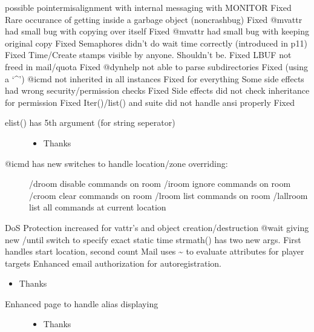 \documentclass[letterpaper,10pt,english]{sphinxmanual}
\begin{document}
\sphinxAtStartPar
possible pointer\sphinxhyphen{}misalignment with internal messaging with MONITOR \sphinxhyphen{} Fixed
Rare occurance of getting inside a garbage object (non\sphinxhyphen{}crash\sphinxhyphen{}bug) \sphinxhyphen{} Fixed
@mvattr had small bug with copying over itself \sphinxhyphen{} Fixed
@mvattr had small bug with keeping original copy \sphinxhyphen{} Fixed
Semaphores didn’t do wait time correctly (introduced in p11) \sphinxhyphen{} Fixed
Time/Create stamps visible by anyone. Shouldn’t be. \sphinxhyphen{} Fixed
LBUF not freed in mail/quota \sphinxhyphen{} Fixed
@dynhelp not able to parse subdirectories \sphinxhyphen{} Fixed (using a ‘\textasciicircum{}’)
@icmd not inherited in all instances \sphinxhyphen{} Fixed for everything
Some side effects had wrong security/permission checks \sphinxhyphen{} Fixed
Side effects did not check inheritance for permission \sphinxhyphen{} Fixed
Iter()/list() and suite did not handle ansi properly \sphinxhyphen{} Fixed
\begin{description}
\item[{elist() has 5th argument (for string seperator)}] \leavevmode\begin{itemize}
\item {} 
\sphinxAtStartPar
Thanks 

\end{itemize}

\item[{@icmd has new switches to handle location/zone overriding:}] \leavevmode
\sphinxAtStartPar
/droom \sphinxhyphen{} disable commands on room
/iroom \sphinxhyphen{} ignore commands on room
/croom \sphinxhyphen{} clear commands on room
/lroom \sphinxhyphen{} list commands on room
/lallroom \sphinxhyphen{} list all commands at current location

\end{description}

\sphinxAtStartPar
DoS Protection increased for vattr’s and object creation/destruction
@wait giving new /until switch to specify exact static time
strmath() has two new args.  First handles start location, second count
Mail uses \textasciitilde{} to evaluate attributes for player targets
Enhanced email authorization for autoregistration.
\begin{itemize}
\item {} 
\sphinxAtStartPar
Thanks 

\end{itemize}
\begin{description}
\item[{Enhanced page to handle alias displaying}] \leavevmode\begin{itemize}
\item {} 
\sphinxAtStartPar
Thanks 

\end{itemize}

\end{description}
\end{document}
